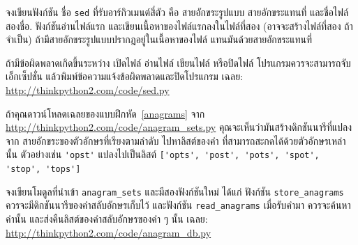 \begin{exercise}

%

%
จงเขียนฟังก์ชัน ชื่อ \texttt{sed} ที่รับอาร์กิวเมนต์สี่ตัว คือ
สายอักขระรูปแบบ สายอักขระแทนที่ และชื่อไฟล์สองชื่อ.
ฟังก์ชันอ่านไฟล์แรก และเขียนเนื้อหาของไฟล์แรกลงในไฟล์ที่สอง (อาจจะสร้างไฟล์ที่สอง ถ้าจำเป็น)
ถ้ามีสายอักขระรูปแบบปรากฎอยู่ในเนื้อหาของไฟล์ แทนมันด้วยสายอักขระแทนที่

ถ้ามีข้อผิดพลาดเกิดขึ้นระหว่าง เปิดไฟล์ อ่านไฟล์ เขียนไฟล์ หรือปิดไฟล์
โปรแกรมควรจะสามารถจับเอ็กเซ็ปชั่น แล้วพิมพ์ข้อความแจ้งข้อผิดพลาดและปิดโปรแกรม  เฉลย: \url{http://thinkpython2.com/code/sed.py}

\end{exercise}
\vspace{0.5cm}


\begin{exercise}


ถ้าคุณดาวน์โหลดเฉลยของแบบฝึกหัด~\ref{anagrams} จาก
\url{http://thinkpython2.com/code/anagram_sets.py}
คุณจะเห็นว่ามันสร้างดิกชันนารีที่แปลงจาก สายอักขระของตัวอักษรที่เรียงตามลำดับ
ไปหาลิสต์ของคำ ที่สามารถสะกดได้ด้วยตัวอักษรเหล่านั้น
ตัวอย่างเช่น
\verb|'opst'| แปลงไปเป็นลิสต์
\verb|['opts', 'post', 'pots', 'spot', 'stop', 'tops']|


จงเขียนโมดูลที่นำเข้า \verb|anagram_sets| และมีสองฟังก์ชันใหม่
ได้แก่
ฟังก์ชัน \verb|store_anagrams| ควรจะมีดิกชันนารีของคำสลับอักษรเก็บไว้
และฟังก์ชัน \verb|read_anagrams| เมื่อรับคำมา ควรจะค้นหาคำนั้น 
และส่งคืนลิสต์ของคำสลับอักษรของคำ ๆ นั้น
เฉลย: \url{http://thinkpython2.com/code/anagram_db.py}

\end{exercise}
\vspace{0.5cm}


